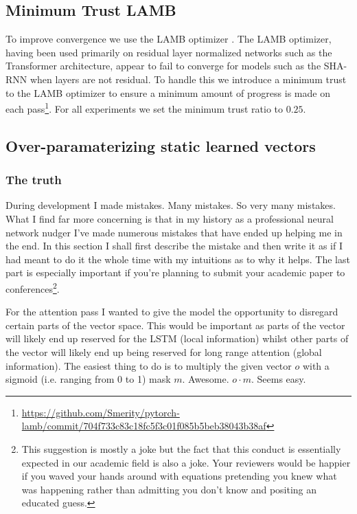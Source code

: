 \documentclass{article}
\begin{document}
\subsection{Minimum Trust LAMB}

To improve convergence we use the LAMB optimizer \citep{you2019reducing}.
The LAMB optimizer, having been used primarily on residual layer normalized networks such as the Transformer architecture, appear to fail to converge for models such as the SHA-RNN when layers are not residual.
To handle this we introduce a minimum trust to the LAMB optimizer to ensure a minimum amount of progress is made on each pass\footnote{\url{https://github.com/Smerity/pytorch-lamb/commit/704f733c83c18fc5f3c01f085b5beb38043b38af}}.
For all experiments we set the minimum trust ratio to $0.25$.

\subsection{Over-paramaterizing static learned vectors}
\label{sec:opslv}

\subsubsection{The truth}

During development I made mistakes.
Many mistakes.
So very many mistakes.
What I find far more concerning is that in my history as a professional neural network nudger I've made numerous mistakes that have ended up helping me in the end.
In this section I shall first describe the mistake and then write it as if I had meant to do it the whole time with my intuitions as to why it helps.
The last part is especially important if you're planning to submit your academic paper to conferences\footnote{This suggestion is mostly a joke but the fact that this conduct is essentially expected in our academic field is also a joke. Your reviewers would be happier if you waved your hands around with equations pretending you knew what was happening rather than admitting you don't know and positing an educated guess.}.

For the attention pass I wanted to give the model the opportunity to disregard certain parts of the vector space.
This would be important as parts of the vector will likely end up reserved for the LSTM (local information) whilst other parts of the vector will likely end up being reserved for long range attention (global information).
The easiest thing to do is to multiply the given vector $o$ with a sigmoid (i.e. ranging from 0 to 1) mask $m$.
Awesome.
$o \cdot m$.
Seems easy.
\end{document}
